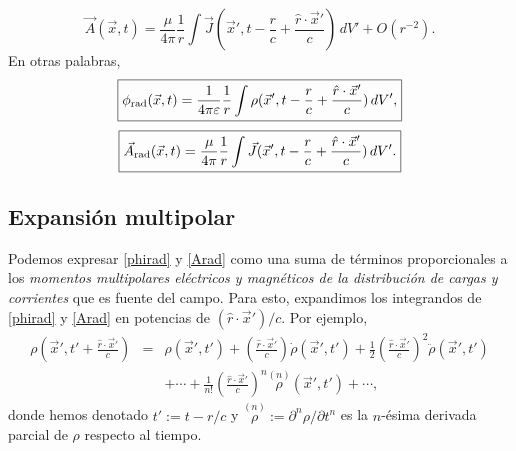 \begin{equation}
 \vec{A}(\vec{x},t)=\frac{\mu}{4\pi}\frac{1}{r}\int\vec{J}(\vec{x}',t-\frac{r}{c}+\frac{\hat{r}\cdot\vec{x}'}{c})\,dV'+O(r^{-2}).
\end{equation}
En otras palabras,
\begin{equation}
 \boxed{\phi_{\rm rad}(\vec{x},t)
=\frac{1}{4\pi\varepsilon}\frac{1}{r}\int\rho(\vec{x}',t-\frac{r}{c}+\frac{\hat{r}\cdot\vec{x}'}{c})\,dV',} \label{phirad}
\end{equation}
\begin{equation}
 \boxed{\vec{A}_{\rm rad}(\vec{x},t)
=\frac{\mu}{4\pi}\frac{1}{r}\int\vec{J}(\vec{x}',t-\frac{r}{c}+\frac{\hat{r}\cdot\vec{x}'}{c})\,dV'.} \label{Arad}
\end{equation}

\subsection{Expansión multipolar}\label{sec:emr}

Podemos expresar \eqref{phirad} y \eqref{Arad} como una suma de términos proporcionales a los \textit{momentos multipolares eléctricos y magnéticos de la distribución de cargas y corrientes} que es fuente del campo. Para esto, expandimos los integrandos de \eqref{phirad} y \eqref{Arad} en potencias de $(\hat{r}\cdot\vec{x}')/c$. Por ejemplo,
\begin{eqnarray}
 \rho(\vec{x}',t'+\frac{\hat{r}\cdot\vec{x}'}{c})&=&\rho(\vec{x}',t')+\left(\frac{\hat{r}\cdot\vec{x}'}{c}\right)\dot\rho(\vec{x}',t')+\frac{1}{2}\left(\frac{\hat{r}\cdot\vec{x}'}{c}\right)^2\ddot\rho(\vec{x}',t') \nonumber\\
 &&+\cdots+\frac{1}{n!}\left(\frac{\hat{r}\cdot\vec{x}'}{c}\right)^n\stackrel{(n)}{\rho}\!\!\!(\vec{x}',t')+\cdots ,
\end{eqnarray}
donde hemos denotado $t':=t-r/c$ y $\stackrel{(n)}{\rho}:=\partial^n\rho/\partial t^n$ es la $n$-ésima derivada parcial de $\rho$ respecto al tiempo.

